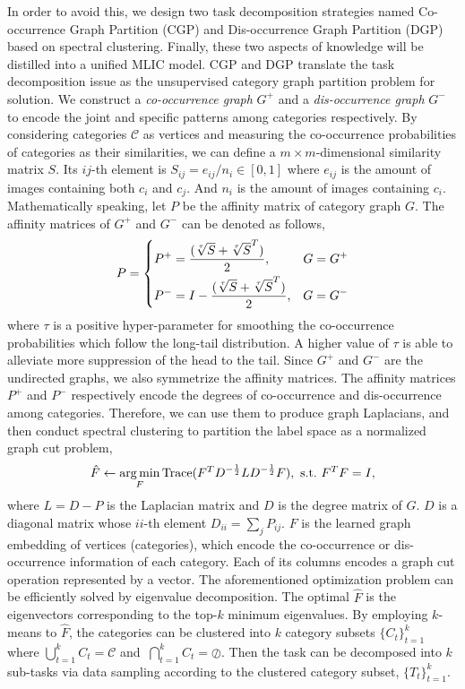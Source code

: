 \documentclass{article}
\begin{document}
In order to avoid this, we design two task decomposition strategies named Co-occurrence Graph Partition (CGP) and Dis-occurrence Graph Partition (DGP) based on spectral clustering.
Finally, these two aspects of knowledge will be distilled into a unified MLIC model.
CGP and DGP translate the task decomposition issue as the unsupervised category graph partition problem for solution.
We construct a \emph{co-occurrence graph} $G^+$ and a \emph{dis-occurrence graph} $G^-$ to encode the joint and specific patterns among categories respectively.
By considering categories $\mathcal{C}$ as vertices and measuring the co-occurrence probabilities of categories as their similarities, we can define a $m\times m$-dimensional similarity matrix $S$.
Its $ij$-th element is $S_{ij}=e_{ij}/n_i \in [0,1]$ where $e_{ij}$ is the amount of images containing both $c_i$ and $c_j$. And $n_i$ is the amount of images containing $c_i$.
Mathematically speaking, let $P$ be the affinity matrix of category graph $G$. The affinity matrices of $G^+$ and $G^-$ can be denoted as follows,
{\small
\begin{equation}\label{smooth_sym}
\setlength{\abovedisplayskip}{1mm}
\setlength{\belowdisplayskip}{1mm}
P=\left\{
\begin{aligned}
  P^+&=\frac{(\sqrt[\tau]{S}+\sqrt[\tau]{S}^T)}{2}, & G=G^+ \\
  P^-&=I-\frac{(\sqrt[\tau]{S}+\sqrt[\tau]{S}^T)}{2}, & G=G^-
\end{aligned}
\right.
\end{equation}
}
where $\tau$ is a positive hyper-parameter for smoothing the co-occurrence probabilities which follow the long-tail distribution. A higher value of  $\tau$ is able to alleviate more suppression of the head to the tail.  Since $G^+$ and $G^-$ are the undirected graphs, we also symmetrize the affinity matrices. The affinity matrices $P^+$ and $P^-$ respectively encode the degrees of co-occurrence and dis-occurrence among categories. Therefore, we can use them to produce graph Laplacians, and then conduct spectral clustering to partition the label space as a normalized graph cut problem,
{\small
\begin{equation}
\setlength{\abovedisplayskip}{1mm}
\setlength{\belowdisplayskip}{1mm}
    \hat{F}\leftarrow\mathop{\arg\min}\limits_{F} \text{Trace}(F^{T}D^{-\frac{1}{2}}LD^{-\frac{1}{2}}F),~\text{s.t.}~F^{T}F=I,
\end{equation}
}
where $L=D-P$ is the Laplacian matrix and $D$ is the degree matrix of $G$. $D$ is a diagonal matrix whose $ii$-th element $D_{ii}=\sum_j P_{ij}$. $F$ is the learned graph embedding of vertices (categories), which encode the co-occurrence or dis-occurrence information of each category. Each of its columns encodes a graph cut operation represented by a vector. The aforementioned optimization problem can be efficiently solved by eigenvalue decomposition. The optimal $\hat{F}$ is the eigenvectors corresponding to the top-$k$ minimum eigenvalues. By employing $k$-means to $\hat{F}$, the categories can be clustered into $k$ category subsets $\{C_t\}_{t=1}^k$ where $\bigcup_{t=1}^kC_t=\mathcal{C}$ and $~\bigcap_{t=1}^k C_t= \oslash$. Then the task can be decomposed into $k$ sub-tasks via data sampling according to the clustered category subset, $\{T_t\}_{t=1}^k$.
\end{document}
